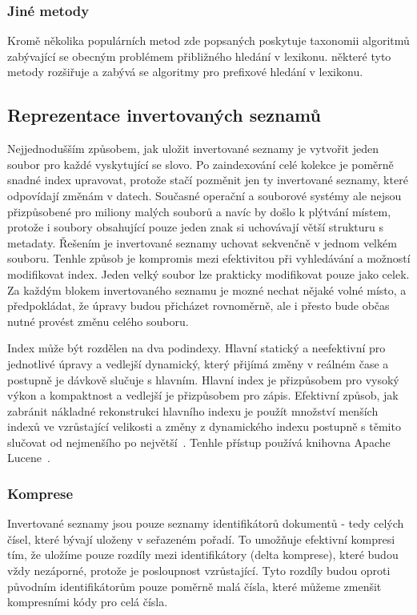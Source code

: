 \documentclass[11pt,letterpaper,oneside,openright]{book}
\begin{document}
\subsubsection{Jiné metody}
Kromě několika populárních metod zde popsaných poskytuje
\cite{Boytsov:2011:IMA:1963190.1963191} taxonomii algoritmů zabývající se
obecným problémem přibližného hledání v lexikonu.
\cite{Bast:2013:EFS:2457465.2457470} některé tyto metody rozšiřuje a zabývá se
algoritmy pro prefixové hledání v lexikonu.



\subsection{Reprezentace invertovaných seznamů}
Nejjednodušším způsobem, jak uložit invertované seznamy je vytvořit jeden
soubor pro každé vyskytující se slovo. Po zaindexování celé kolekce je poměrně
snadné index upravovat, protože stačí pozměnit jen ty invertované seznamy,
které odpovídají změnám v datech. Současné operační a souborové systémy ale
nejsou přizpůsobené pro miliony malých souborů a navíc by došlo k plýtvání
místem, protože i soubory obsahující pouze jeden znak si uchovávají větší
strukturu s metadaty. Řešením je invertované seznamy uchovat sekvenčně v jednom
velkém souboru. Tenhle způsob je kompromis mezi efektivitou při vyhledávání a
možností modifikovat index. Jeden velký soubor lze prakticky modifikovat pouze
jako celek. Za každým blokem invertovaného seznamu je mozné nechat nějaké volné
místo, a předpokládat, že úpravy budou přicházet rovnoměrně, ale i přesto bude
občas nutné provést změnu celého souboru.

Index může být rozdělen na dva podindexy. Hlavní statický a neefektivní pro
jednotlivé úpravy a vedlejší dynamický, který přijímá změny v reálném čase a
postupně je dávkově slučuje s hlavním. Hlavní index je přizpůsobem pro vysoký
výkon a kompaktnost a vedlejší je přizpůsobem pro zápis. Efektivní způsob, jak
zabránit nákladné rekonstrukci hlavního indexu je použít množství menších
indexů ve vzrůstající velikosti a změny z dynamického indexu postupně s těmito
slučovat od nejmenšího po největší~\citep[kap.~4]{Manning:2008:IIR:1394399}.
Tenhle přístup používá knihovna Apache Lucene~\cite{lsm_lucene}.

\subsubsection{Komprese}
Invertované seznamy jsou pouze seznamy identifikátorů dokumentů - tedy celých
čísel, které bývají uloženy v seřazeném pořadí. To umožňuje efektivní kompresi
tím, že uložíme pouze rozdíly mezi identifikátory (delta komprese), které budou
vždy nezáporné, protože je posloupnost vzrůstající. Tyto rozdíly budou oproti
původním identifikátorům pouze poměrně malá čísla, které můžeme zmenšit
kompresními kódy pro celá čísla.
\end{document}
